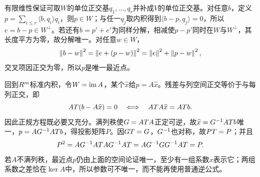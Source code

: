 \label{der:7-4}
有限维性保证可取$W$的单位正交基$q_1,\ldots,q_r$并补成$V$的单位正交基。对任意$b$，定义$p=\sum_{i\le r}\langle b,q_i\rangle q_i$，则$p\in W$；与任一$q_j$取内积得到$\langle b-p,q_j\rangle=0$，所以$e=b-p\in W^\perp$。若还有$b=p'+e'$为同样分解，相减使$p-p'$同时在$W$与$W^\perp$，其长度平方为零，故分解唯一。对任意$w\in W$，
\[\left\lVert b-w\right\rVert^2=\left\lVert e+(p-w)\right\rVert^2=\left\lVert e\right\rVert^2+\left\lVert p-w\right\rVert^2,\]
交叉项因正交为零，所以$p$是唯一最近点。

回到$R^m$标准内积，令$W=\operatorname{im} A$，某个$\widehat x$给$p=A\widehat x$。残差与列空间正交等价于与每列正交，即
\[AT(b-A\widehat x)=0\quad\Longleftrightarrow\quad AT A\widehat x=AT b.\]
因此正规方程既必要又充分。满列秩使$G=AT A$正定可逆，故$\widehat x=G^{-1} AT b$唯一，$p=A G^{-1} AT b$，得投影矩阵$P$。因$GT=G$，$G^{-1}$也对称，故$PT=P$；并且
\[P^2=AG^{-1} AT AG^{-1} AT=AG^{-1} GG^{-1} AT=P.\]
若$A$不满列秩，最近点$p$仍由上面的空间论证唯一，至少有一组系数$x$表示它；两组系数之差恰在$\ker A$中，所以参数可不唯一，而不能再使用普通逆公式。
